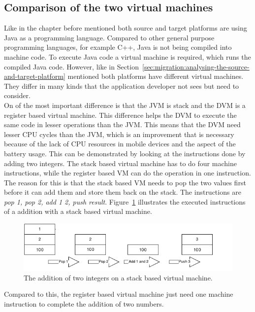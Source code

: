 \subsection{Comparison of the two virtual machines}
\label{sec:migration:comparison-of-the-two-virtual-machines}
Like in the chapter before mentioned both source and target platforms are using Java as a programming language.
Compared to other general purpose programming languages, for example C++, Java is not being compiled into machine code.
To execute Java code a virtual machine is required, which runs the compiled Java code.
However, like in Section~\ref{sec:migration:analysing-the-source-and-target-platform} mentioned both platforms have different virtual machines.
They differ in many kinds that the application developer not sees but need to consider.
\\
On of the most important difference is that the JVM is stack and the DVM is a register based virtual machine.
This difference helps the DVM to execute the same code in lesser operations than the JVM.
This means that the DVM need lesser CPU cycles than the JVM, which is an improvement that is necessary because of the lack of CPU resources in mobile devices and the aspect of the battery usage.
This can be demonstrated by looking at the instructions done by adding two integers.
The stack based virtual machine has to do four machine instructions, while the register based VM can do the operation in one instruction.
The reason for this is that the stack based VM needs to pop the two values first before it can add them and store them back on the stack.
The instructions are \textit{pop 1, pop 2, add 1 2, push result}.
Figure~\ref{fig:stack-based-addition} illustrates the executed instructions of a addition with a stack based virtual machine.
\begin{figure}[h]
\begin{center}
\includegraphics[scale=0.65]{images/stack-based-addition.png} 
\caption{The addition of two integers on a stack based virtual machine.}
\label{fig:stack-based-addition}
\end{center}
\end{figure}
Compared to this, the register based virtual machine just need one machine instruction to complete the addition of two numbers.
